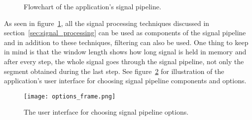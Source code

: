 \begin{figure}[h!]
	
	\caption{Flowchart of the application's signal pipeline.}
	\label{fig:signal_pipeline}
\end{figure}

As seen in figure~\ref{fig:signal_pipeline}, all the signal processing techniques discussed in section~\ref{sec:signal_processing} can be used as components of the signal pipeline and in addition to these techniques, filtering can also be used. One thing to keep in mind is that the \gls{window} length shows how long signal is held in memory and after every step, the whole signal goes through the signal pipeline, not only the segment obtained during the last step. See figure~\ref{fig:options_frame} for illustration of the application's user interface for choosing signal pipeline components and options.

\begin{figure}[h]
	\centering
	\texttt{[image: options\_frame.png]}
	\caption{The user interface for choosing signal pipeline options.}
	\label{fig:options_frame}
\end{figure}

